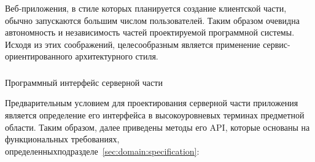 Веб-приложения, в стиле которых планируется создание клиентской части, обычно запускаются большим числом
пользователей. Таким образом очевидна автономность и независимость частей проектируемой программной системы.
Исходя из этих соображений, целесообразным является применение сервис-ориентированного архитектурного стиля.

\subsubsection{} Программный интерфейс серверной части
\label{sec:design:server:interface}

Предварительным условием для проектирования серверной части приложения является определение его интерфейса в
высокоуровневых терминах предметной области. Таким образом, далее приведены методы его API, которые основаны на
функциональных требованиях, определенных подразделе~\ref{sec:domain:specification}:

